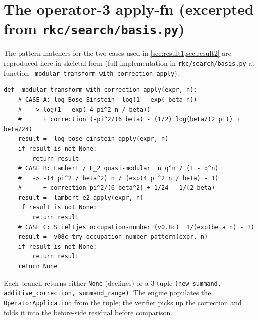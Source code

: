 \documentclass[11pt,reqno]{amsart}
\theoremstyle{definition}
\begin{document}
\appendix

\section{The operator-3 apply-fn (excerpted from \texttt{rkc/search/basis.py})}\label{app:apply-fn}

The pattern matchers for the two cases used in
\cref{sec:result1,sec:result2} are reproduced here in skeletal form
(full implementation in \verb|rkc/search/basis.py| at function
\verb|_modular_transform_with_correction_apply|):

\begin{verbatim}
def _modular_transform_with_correction_apply(expr, n):
    # CASE A: log Bose-Einstein  log(1 - exp(-beta n))
    #   -> log(1 - exp(-4 pi^2 n / beta))
    #      + correction (-pi^2/(6 beta) - (1/2) log(beta/(2 pi)) + beta/24)
    result = _log_bose_einstein_apply(expr, n)
    if result is not None:
        return result
    # CASE B: Lambert / E_2 quasi-modular  n q^n / (1 - q^n)
    #   -> -(4 pi^2 / beta^2) n / (exp(4 pi^2 n / beta) - 1)
    #      + correction pi^2/(6 beta^2) + 1/24 - 1/(2 beta)
    result = _lambert_e2_apply(expr, n)
    if result is not None:
        return result
    # CASE C: Stieltjes occupation-number (v0.8c)  1/(exp(beta n) - 1)
    result = _v08c_try_occupation_number_pattern(expr, n)
    if result is not None:
        return result
    return None
\end{verbatim}

Each branch returns either \verb|None| (declines) or a $3$-tuple
\verb|(new_summand, additive_correction, summand_range)|. The engine
populates the \verb|OperatorApplication| from the tuple; the
verifier picks up the correction and folds it into the before-side
residual before comparison.

\nocite{AB2009,AB2012,AB2013,BerndtNB1,BerndtNB5,BerndtDixit2009,DixitBerndt1995,BerndtBhargava2022,BerndtYee2002,Hickerson1988,Ono2015}



\end{document}
